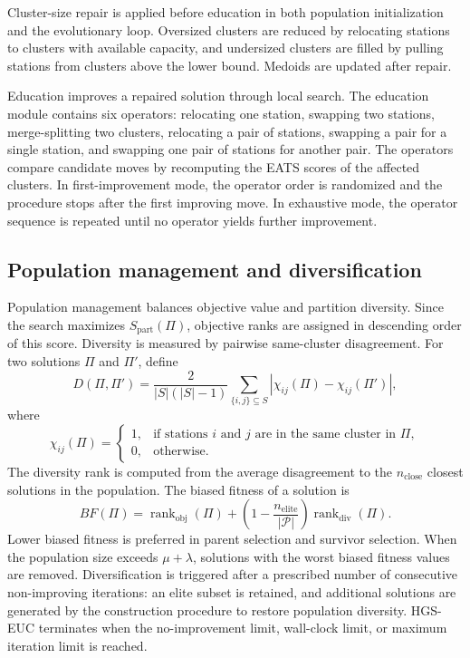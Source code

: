 Cluster-size repair is applied before education in both population initialization
and the evolutionary loop. Oversized clusters are reduced by relocating stations
to clusters with available capacity, and undersized clusters are filled by
pulling stations from clusters above the lower bound. Medoids are updated after
repair.

Education improves a repaired solution through local search. The education
module contains six operators: relocating one station, swapping two stations,
merge-splitting two clusters, relocating a pair of stations, swapping a pair for
a single station, and swapping one pair of stations for another pair. The
operators compare candidate moves by recomputing the EATS scores of the affected
clusters. In first-improvement mode, the operator order is randomized and the
procedure stops after the first improving move. In exhaustive mode, the operator
sequence is repeated until no operator yields further improvement.

\subsection{Population management and diversification}\label{ch5:sec:hgs-euc-population}

Population management balances objective value and partition diversity. Since
the search maximizes $S_{\mathrm{part}}(\Pi)$, objective ranks are assigned in
descending order of this score. Diversity is measured by pairwise same-cluster
disagreement. For two solutions $\Pi$ and $\Pi'$, define
\begin{equation}
D(\Pi,\Pi')=
\frac{2}{|S|(|S|-1)}
\sum_{\{i,j\}\subseteq S}
\left|\chi_{ij}(\Pi)-\chi_{ij}(\Pi')\right|,
\label{ch5:eq:partition-disagreement}
\end{equation}
where
\begin{equation}
\chi_{ij}(\Pi)=
\begin{cases}
1, & \text{if stations } i \text{ and } j \text{ are in the same cluster in } \Pi,\\
0, & \text{otherwise.}
\end{cases}
\label{ch5:eq:same-cluster-indicator}
\end{equation}
The diversity rank is computed from the average disagreement to the
$n_{\mathrm{close}}$ closest solutions in the population. The biased fitness of a
solution is
\begin{equation}
BF(\Pi)=\operatorname{rank}_{\mathrm{obj}}(\Pi)+
\left(1-\frac{n_{\mathrm{elite}}}{|\mathcal P|}\right)
\operatorname{rank}_{\mathrm{div}}(\Pi).
\label{ch5:eq:biased-fitness-hgs-euc}
\end{equation}
Lower biased fitness is preferred in parent selection and survivor selection.
When the population size exceeds $\mu+\lambda$, solutions with the worst biased
fitness values are removed. Diversification is triggered after a prescribed
number of consecutive non-improving iterations: an elite subset is retained, and
additional solutions are generated by the construction procedure to restore
population diversity. HGS-EUC terminates when the no-improvement limit,
wall-clock limit, or maximum iteration limit is reached.



